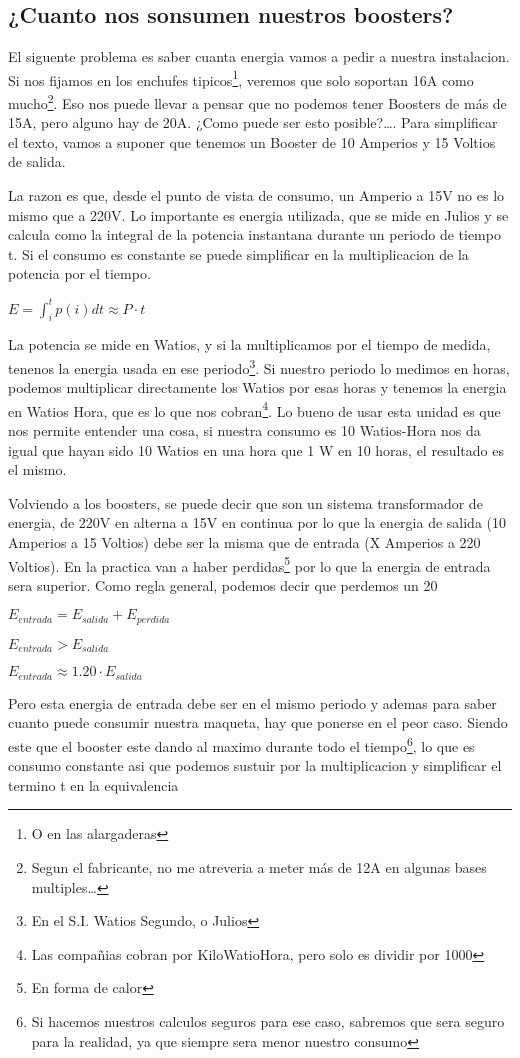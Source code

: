 \subsection{¿Cuanto nos sonsumen nuestros boosters?}
El siguente problema es saber cuanta energia vamos a pedir a nuestra instalacion. 
Si nos fijamos en los enchufes tipicos\footnote{O en las alargaderas}, veremos que solo soportan 16A como mucho\footnote{Segun el fabricante, no me atreveria a meter más de 12A en algunas bases multiples\dots}. Eso nos puede llevar a pensar que no podemos tener Boosters de más de 15A, pero alguno hay de 20A. ¿Como puede ser esto posible?\dots. Para simplificar el texto, vamos a suponer que tenemos un Booster de 10 Amperios y 15 Voltios de salida.

La razon es que, desde el punto de vista de consumo, un Amperio a 15V no es lo mismo que a 220V. Lo importante es energia utilizada, que se mide en Julios y se calcula como la integral de la potencia instantana durante un periodo de tiempo t. Si el consumo es constante se puede simplificar en la multiplicacion de la potencia por el tiempo.

$ E= \int_{i}^{t}{p(i)dt} \approx P\cdot t$ 

La potencia se mide en Watios, y si la multiplicamos por el tiempo de medida, tenenos la energia usada en ese periodo\footnote{En el S.I. Watios Segundo, o Julios}. Si nuestro periodo lo medimos en horas, podemos multiplicar directamente los Watios por esas horas y tenemos la energia en Watios Hora, que es lo que nos cobran\footnote{Las compañias cobran por KiloWatioHora, pero solo es dividir por 1000}. Lo bueno de usar esta unidad es que nos permite entender una cosa, si nuestra consumo es 10 Watios-Hora nos da igual que hayan sido 10 Watios en una hora que 1 W en 10 horas, el resultado es el mismo.

Volviendo a los boosters, se puede decir que son un sistema transformador de energia, de 220V en alterna a 15V en continua por lo que la energia de salida (10 Amperios a 15 Voltios) debe ser la misma que de entrada (X Amperios a 220 Voltios). En la practica van a haber perdidas\footnote{En forma de calor} por lo que la energia de entrada sera superior. Como regla general, podemos decir que perdemos un 20%

$E_{entrada} = E_{salida} + E_{perdida}$

$E_{entrada} > E_{salida}$

$E_{entrada} \approx 1.20 \cdot E_{salida}$

Pero esta energia de entrada debe ser en el mismo periodo y ademas para saber cuanto puede consumir nuestra maqueta, hay que ponerse en el peor caso. Siendo este que el booster este dando al maximo durante todo el tiempo\footnote{Si hacemos nuestros calculos seguros para ese caso, sabremos que sera seguro para la realidad, ya que siempre sera menor nuestro consumo}, lo que es consumo constante asi que podemos sustuir por la multiplicacion y simplificar el termino t en la equivalencia

